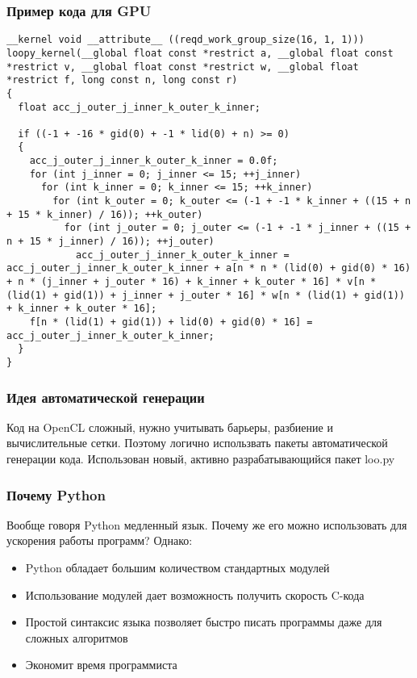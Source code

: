 \documentclass[presentation]{beamer}
\begin{document}
\begin{frame}[fragile]
\frametitle{Пример кода для GPU}
\label{sec-1-3}


\begin{verbatim}
__kernel void __attribute__ ((reqd_work_group_size(16, 1, 1))) loopy_kernel(__global float const *restrict a, __global float const *restrict v, __global float const *restrict w, __global float *restrict f, long const n, long const r)
{
  float acc_j_outer_j_inner_k_outer_k_inner;

  if ((-1 + -16 * gid(0) + -1 * lid(0) + n) >= 0)
  {
    acc_j_outer_j_inner_k_outer_k_inner = 0.0f;
    for (int j_inner = 0; j_inner <= 15; ++j_inner)
      for (int k_inner = 0; k_inner <= 15; ++k_inner)
        for (int k_outer = 0; k_outer <= (-1 + -1 * k_inner + ((15 + n + 15 * k_inner) / 16)); ++k_outer)
          for (int j_outer = 0; j_outer <= (-1 + -1 * j_inner + ((15 + n + 15 * j_inner) / 16)); ++j_outer)
            acc_j_outer_j_inner_k_outer_k_inner = acc_j_outer_j_inner_k_outer_k_inner + a[n * n * (lid(0) + gid(0) * 16) + n * (j_inner + j_outer * 16) + k_inner + k_outer * 16] * v[n * (lid(1) + gid(1)) + j_inner + j_outer * 16] * w[n * (lid(1) + gid(1)) + k_inner + k_outer * 16];
    f[n * (lid(1) + gid(1)) + lid(0) + gid(0) * 16] = acc_j_outer_j_inner_k_outer_k_inner;
  }
}
\end{verbatim}
\end{frame}
\begin{frame}
\frametitle{Идея автоматической генерации}
\label{sec-1-4}

Код на OpenCL сложный, нужно учитывать барьеры, разбиение и вычислительные сетки.
Поэтому логично использвать пакеты автоматической генерации кода. 
Использован новый, активно разрабатывающийся пакет loo.py
\end{frame}
\begin{frame}
\frametitle{Почему Python}
\label{sec-1-5}

Вообще говоря Python медленный язык. Почему же его можно использовать для ускорения работы программ?
Однако:
\begin{itemize}
\item Python обладает большим количеством стандартных модулей
\item Использование модулей дает возможность получить скорость C-кода
\item Простой синтаксис языка позволяет быстро писать программы даже для сложных алгоритмов
\item Экономит время программиста
\end{itemize}
\end{frame}
\end{document}

